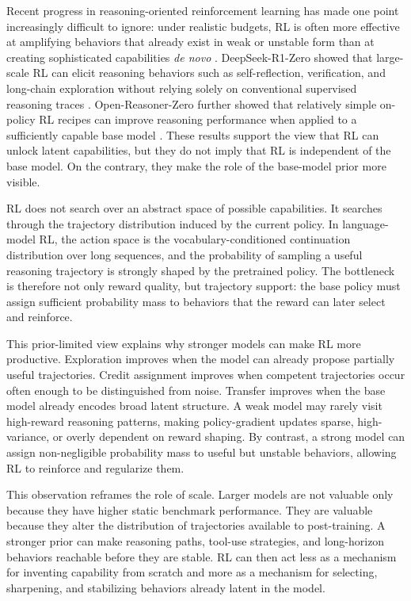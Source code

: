Recent progress in reasoning-oriented reinforcement learning has made one point increasingly difficult to ignore: under realistic budgets, RL is often more effective at amplifying behaviors that already exist in weak or unstable form than at creating sophisticated capabilities \emph{de novo} \citep{deepseek2025r1,hu2025openreasonerzero}. DeepSeek-R1-Zero showed that large-scale RL can elicit reasoning behaviors such as self-reflection, verification, and long-chain exploration without relying solely on conventional supervised reasoning traces \citep{deepseek2025r1}. Open-Reasoner-Zero further showed that relatively simple on-policy RL recipes can improve reasoning performance when applied to a sufficiently capable base model \citep{hu2025openreasonerzero}. These results support the view that RL can unlock latent capabilities, but they do not imply that RL is independent of the base model. On the contrary, they make the role of the base-model prior more visible.

RL does not search over an abstract space of possible capabilities. It searches through the trajectory distribution induced by the current policy. In language-model RL, the action space is the vocabulary-conditioned continuation distribution over long sequences, and the probability of sampling a useful reasoning trajectory is strongly shaped by the pretrained policy. The bottleneck is therefore not only reward quality, but trajectory support: the base policy must assign sufficient probability mass to behaviors that the reward can later select and reinforce.

This prior-limited view explains why stronger models can make RL more productive. Exploration improves when the model can already propose partially useful trajectories. Credit assignment improves when competent trajectories occur often enough to be distinguished from noise. Transfer improves when the base model already encodes broad latent structure. A weak model may rarely visit high-reward reasoning patterns, making policy-gradient updates sparse, high-variance, or overly dependent on reward shaping. By contrast, a strong model can assign non-negligible probability mass to useful but unstable behaviors, allowing RL to reinforce and regularize them.

This observation reframes the role of scale. Larger models are not valuable only because they have higher static benchmark performance. They are valuable because they alter the distribution of trajectories available to post-training. A stronger prior can make reasoning paths, tool-use strategies, and long-horizon behaviors reachable before they are stable. RL can then act less as a mechanism for inventing capability from scratch and more as a mechanism for selecting, sharpening, and stabilizing behaviors already latent in the model.

